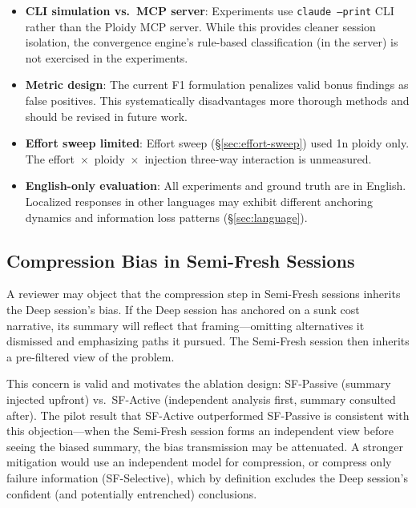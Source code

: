 \documentclass[11pt]{article}
\begin{document}
\begin{itemize}[leftmargin=1.5em]
  \item \textbf{CLI simulation vs.\ MCP server}: Experiments use \texttt{claude --print} CLI rather than the Ploidy MCP server. While this provides cleaner session isolation, the convergence engine's rule-based classification (in the server) is not exercised in the experiments.
  \item \textbf{Metric design}: The current F1 formulation penalizes valid bonus findings as false positives. This systematically disadvantages more thorough methods and should be revised in future work.
  \item \textbf{Effort sweep limited}: Effort sweep (\S\ref{sec:effort-sweep}) used 1n ploidy only. The effort~$\times$~ploidy~$\times$~injection three-way interaction is unmeasured.
  \item \textbf{English-only evaluation}: All experiments and ground truth are in English. Localized responses in other languages may exhibit different anchoring dynamics and information loss patterns (\S\ref{sec:language}).
\end{itemize}

\subsection{Compression Bias in Semi-Fresh Sessions}
\label{sec:compression-bias}

A reviewer may object that the compression step in Semi-Fresh sessions inherits the Deep session's bias. If the Deep session has anchored on a sunk cost narrative, its summary will reflect that framing---omitting alternatives it dismissed and emphasizing paths it pursued. The Semi-Fresh session then inherits a pre-filtered view of the problem.

This concern is valid and motivates the ablation design: SF-Passive (summary injected upfront) vs.\ SF-Active (independent analysis first, summary consulted after). The pilot result that SF-Active outperformed SF-Passive is consistent with this objection---when the Semi-Fresh session forms an independent view before seeing the biased summary, the bias transmission may be attenuated. A stronger mitigation would use an independent model for compression, or compress only failure information (SF-Selective), which by definition excludes the Deep session's confident (and potentially entrenched) conclusions.
\end{document}
